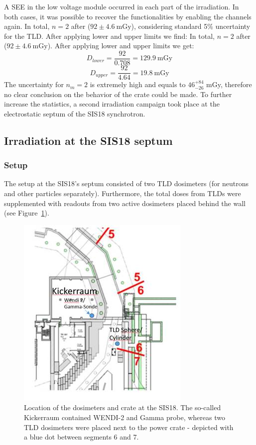 A \gls{SEE} in the low voltage module occurred in each part of the irradiation. In both cases, it was possible to recover the functionalities by enabling the channels again. In total, $n=2$ after ($92\pm{4.6}\mathrm{\ mGy}$), considering standard 5\% uncertainty for the TLD. After applying lower and upper limits we find:
In total, $n=2$ after ($92\pm{4.6}\mathrm{\ mGy}$).
After applying lower and upper limits we get:
\begin{equation}
    D_{lower}=\frac{92}{0.708} = 129.9\mathrm{\ mGy}
\end{equation}
\begin{equation}
    D_{upper}=\frac{92}{4.64} = 19.8\mathrm{\ mGy}
\end{equation}
The uncertainty for $n_{m}=2$ is extremely high and equals to $\mathrm{46}_{-26}^{+84}$ mGy, therefore no clear conclusion on the behavior of the crate could be made. To further increase the statistics, a second irradiation campaign took place at the electrostatic septum of the SIS18 synchrotron. 
\subsection{Irradiation at the SIS18 septum}
\subsubsection{Setup}
The setup at the SIS18's septum consisted of two \gls{TLD} dosimeters (for neutrons and other particles separately). Furthermore, the total doses from TLDs were supplemented with readouts from two active dosimeters placed behind the wall (see Figure~\ref{fig:spec_des}). 
\begin{figure}[!ht]
    \centering
    \includegraphics[width=0.45\columnwidth]{Chapter4/images/septum.jpg}
    \caption{Location of the dosimeters and crate at the SIS18. The so-called Kickerraum contained WENDI-2 and Gamma probe, whereas two TLD dosimeters were placed next to the power crate - depicted with a blue dot between segments 6 and 7.}
    \label{fig:spec_des}
\end{figure}

